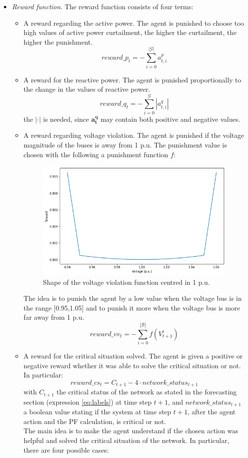 \begin{itemize}
    
    \item \label{4:rewfunc} \emph{Reward function}. The reward function consists of four terms:
    \begin{itemize}
        \item A reward regarding the active power. The agent is punished to choose too high values of active power curtailment, the higher the curtailment, the higher the punishment.
        \[
            reward\_p_t = -\sum_{i=0}^{|\mathcal{G}|}a^p_{t,i}
        \]
        
        \item A reward for the reactive power. The agent is punished proportionally to the change in the values of reactive power. 
        \[
            reward\_q_t = -\sum_{i=0}^{\mathcal{G}} |a^q_{t,i}|
        \]
        \noindent the $|\cdot|$ is needed, since $\mathbf{a^q_t}$ may contain both positive and negative values.
        
        \item A reward regarding voltage violation. The agent is punished if the voltage magnitude of the buses is away from 1 p.u. The punishment value is chosen with the following a punishment function $f$:
        \begin{figure}[H]
        \centering
            \includegraphics[width=.4\linewidth]{images/MVOberr/RL/volatge_violation_function.png}
            \caption[Voltage violation function]{Shape of the voltage violation function centred in 1 p.u.}
        \end{figure}
        \noindent The idea is to punish the agent by a low value when the voltage bus is in the range [0.95,1.05] and to punish it more when the voltage bus is more far away from 1 p.u.
        \[
            reward\_vv_t = -\sum_{i=0}^{|\mathcal{B}|} f(V^{i}_{t+1})
        \]
        
        \item A reward for the critical situation solved. The agent is given a positive or negative reward whether it was able to solve the critical situation or not. In particular:\\
        \[
            reward\_cs_t =  C_{t+1} - 4 \cdot network\_status_{t+1}
        \]
        with $C_{t+1}$ the critical status of the network as stated in the forecasting section (expression \ref{eq:labels}) at time step $t+1$, and $network\_status_{t+1}$ a boolean value stating if the system at time step $t+1$, after the agent action and the \gls{PF} calculation, is critical or not.\\
        The main idea is to make the agent understand if the chosen action was helpful and solved the critical situation of the network. In particular, there are four possible cases:\\
        

\end{itemize}
\end{itemize}
